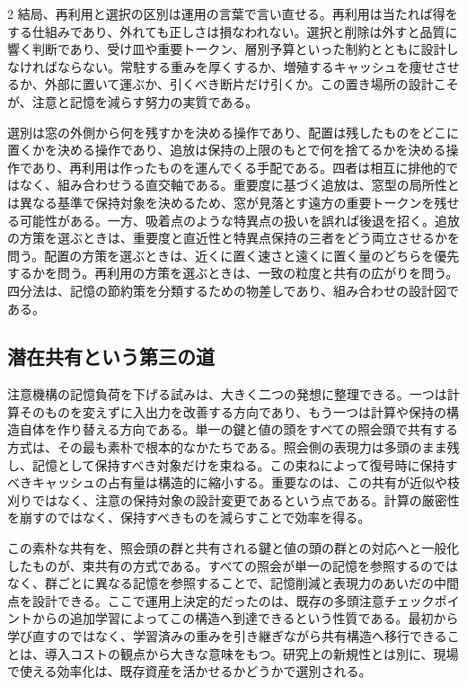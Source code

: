 \documentclass[lualatex,a4paper,10pt]{jlreq}
\begin{document}
\begin{multicols}{2}
結局、再利用と選択の区別は運用の言葉で言い直せる。再利用は当たれば得をする仕組みであり、外れても正しさは損なわれない。選択と削除は外すと品質に響く判断であり、受け皿や重要トークン、層別予算といった制約とともに設計しなければならない\autocite{vllmprefix}\autocite{lmcache}\autocite{h2o}\autocite{sinks}\autocite{pyramidkv}。常駐する重みを厚くするか、増殖するキャッシュを痩せさせるか、外部に置いて運ぶか、引くべき断片だけ引くか。この置き場所の設計こそが、注意と記憶を減らす努力の実質である。

\begin{themeoverview}[四分法の使い方]
選別は窓の外側から何を残すかを決める操作であり、配置は残したものをどこに置くかを決める操作であり、追放は保持の上限のもとで何を捨てるかを決める操作であり、再利用は作ったものを運んでくる手配である。四者は相互に排他的ではなく、組み合わせうる直交軸である。重要度に基づく追放は、窓型の局所性とは異なる基準で保持対象を決めるため、窓が見落とす遠方の重要トークンを残せる可能性がある。一方、吸着点のような特異点の扱いを誤れば後退を招く。追放の方策を選ぶときは、重要度と直近性と特異点保持の三者をどう両立させるかを問う。配置の方策を選ぶときは、近くに置く速さと遠くに置く量のどちらを優先するかを問う。再利用の方策を選ぶときは、一致の粒度と共有の広がりを問う。四分法は、記憶の節約策を分類するための物差しであり、組み合わせの設計図である。
\end{themeoverview}

\subsection{潜在共有という第三の道}
注意機構の記憶負荷を下げる試みは、大きく二つの発想に整理できる。一つは計算そのものを変えずに入出力を改善する方向であり、もう一つは計算や保持の構造自体を作り替える方向である。単一の鍵と値の頭をすべての照会頭で共有する方式は、その最も素朴で根本的なかたちである\autocite{mqa}。照会側の表現力は多頭のまま残し、記憶として保持すべき対象だけを束ねる。この束ねによって復号時に保持すべきキャッシュの占有量は構造的に縮小する。重要なのは、この共有が近似や枝刈りではなく、注意の保持対象の設計変更であるという点である。計算の厳密性を崩すのではなく、保持すべきものを減らすことで効率を得る。

この素朴な共有を、照会頭の群と共有される鍵と値の頭の群との対応へと一般化したものが、束共有の方式である\autocite{gqa}。すべての照会が単一の記憶を参照するのではなく、群ごとに異なる記憶を参照することで、記憶削減と表現力のあいだの中間点を設計できる。ここで運用上決定的だったのは、既存の多頭注意チェックポイントからの追加学習によってこの構造へ到達できるという性質である。最初から学び直すのではなく、学習済みの重みを引き継ぎながら共有構造へ移行できることは、導入コストの観点から大きな意味をもつ。研究上の新規性とは別に、現場で使える効率化は、既存資産を活かせるかどうかで選別される。


\end{multicols}
\end{document}
